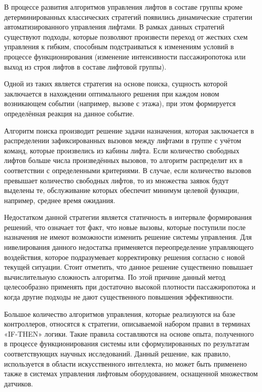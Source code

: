 	В процессе развития алгоритмов управления лифтов в составе группы кроме детерминированных
		классических стратегий появились динамические стратегии автоматизированного управления лифтами.
		В рамках данных стратегий существуют подходы, которые позволяют произвести переход
		от жестких схем управления к гибким, способным подстраиваться к изменениям условий в процессе
		функционирования (изменение интенсивности пассажиропотока или выход из строя лифтов
		в составе лифтовой группы).
	
	Одной из таких является стратегия на основе поиска,
		сущность которой заключается в нахождении оптимального решения при каждом новом возникающем
		событии (например, вызове с этажа), при этом формируется определённая реакция на данное событие.

	Алгоритм поиска производит решение задачи назначения,
		которая заключается в распределении зафиксированных вызовов между лифтами в группе с учётом команд,
		которые произвелись из кабины лифта. Если количество свободных лифтов больше числа произведённых вызовов,
		то алгоритм распределит их в соответствии с определенными критериями.
		В случае, если количество вызовов превышает количество свободных лифтов,
		то из множества заявок будут выделены те, обслуживание которых обеспечит минимум целевой функции,
		например, среднее время ожидания.
		
	Недостатком данной стратегии является статичность в интервале формирования решений,
		что означает тот факт, что новые вызовы, которые поступили после назначения
		не имеют возможности изменить решение системы управления.
		Для нивелирования данного недостатка применяется переопределение управляющего воздействия,
		которое подразумевает корректировку решения согласно с новой текущей ситуации.
		Стоит отметить, что данное решение существенно повышает вычислительную сложность алгоритма.
		По этой причине данный метод целесообразно применять при достаточно высокой плотности
		пассажиропотока и когда другие подходы не дают существенного повышения эффективности.

	Большое количество алгоритмов управления, которые реализуются на базе контроллеров,
		относятся к стратегии, описываемой набором правил в терминах «IF-THEN» логики.
		Такие правила составляются на основе опыта, полученного в процессе функционирования
		системы или сформулированных по результатам соответствующих научных исследований.
		Данный решение, как правило, используется в области искусственного интеллекта,
		но может быть применено также в системах управления лифтовым оборудованием, оснащенной множеством датчиков.

